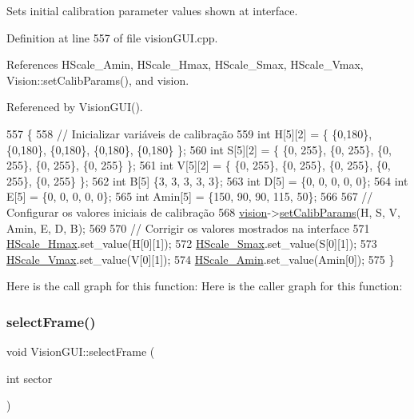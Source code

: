 Sets initial calibration parameter values shown at interface. 



Definition at line 557 of file vision\+G\+U\+I.\+cpp.



References H\+Scale\+\_\+\+Amin, H\+Scale\+\_\+\+Hmax, H\+Scale\+\_\+\+Smax, H\+Scale\+\_\+\+Vmax, Vision\+::set\+Calib\+Params(), and vision.



Referenced by Vision\+G\+U\+I().


\begin{DoxyCode}
557                                   \{
558     \textcolor{comment}{// Inicializar variáveis de calibração}
559     \textcolor{keywordtype}{int} H[5][2] = \{ \{0,180\}, \{0,180\}, \{0,180\}, \{0,180\}, \{0,180\} \};
560     \textcolor{keywordtype}{int} S[5][2] = \{ \{0, 255\}, \{0, 255\}, \{0, 255\}, \{0, 255\}, \{0, 255\} \};
561     \textcolor{keywordtype}{int} V[5][2] = \{ \{0, 255\}, \{0, 255\}, \{0, 255\}, \{0, 255\}, \{0, 255\} \};
562     \textcolor{keywordtype}{int} B[5] \{3, 3, 3, 3, 3\};
563     \textcolor{keywordtype}{int} D[5] = \{0, 0, 0, 0, 0\};
564     \textcolor{keywordtype}{int} E[5] = \{0, 0, 0, 0, 0\};
565     \textcolor{keywordtype}{int} Amin[5] = \{150, 90, 90, 115, 50\};
566 
567     \textcolor{comment}{// Configurar os valores iniciais de calibração}
568     \hyperlink{class_vision_g_u_i_a36aba058af844ec6cbe0c945c616cd5f}{vision}->\hyperlink{class_vision_a5871e49c1e8bdfd214c602707e8dfffc}{setCalibParams}(H, S, V, Amin, E, D, B);
569 
570     \textcolor{comment}{// Corrigir os valores mostrados na interface}
571     \hyperlink{class_vision_g_u_i_a0b1bb9b8a70bd1f93427f71d0e885313}{HScale\_Hmax}.set\_value(H[0][1]);
572     \hyperlink{class_vision_g_u_i_a147e8499bd7412fdb732103c0754f013}{HScale\_Smax}.set\_value(S[0][1]);
573     \hyperlink{class_vision_g_u_i_ab277d08dcce9e2521b9d4c542be69247}{HScale\_Vmax}.set\_value(V[0][1]);
574     \hyperlink{class_vision_g_u_i_a72d3a4fe84821ceafeb4293f196aacd7}{HScale\_Amin}.set\_value(Amin[0]);
575 \}
\end{DoxyCode}
Here is the call graph for this function\+:
Here is the caller graph for this function\+:
\mbox{\label{class_vision_g_u_i_a26659931ea77f5b975fe1d0ce101c74c}} 
\subsubsection{\texorpdfstring{select\+Frame()}{selectFrame()}}
{\footnotesize\ttfamily void Vision\+G\+U\+I\+::select\+Frame (\begin{DoxyParamCaption}\item[{int}]{sector }\end{DoxyParamCaption})}



